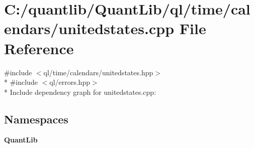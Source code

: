 \section{C\+:/quantlib/\+Quant\+Lib/ql/time/calendars/unitedstates.cpp File Reference}
\label{unitedstates_8cpp}
{\ttfamily \#include $<$ql/time/calendars/unitedstates.\+hpp$>$}\\*
{\ttfamily \#include $<$ql/errors.\+hpp$>$}\\*
Include dependency graph for unitedstates.\+cpp\+:
\subsection*{Namespaces}
\begin{DoxyCompactItemize}
\item 
 {\bf Quant\+Lib}
\end{DoxyCompactItemize}
